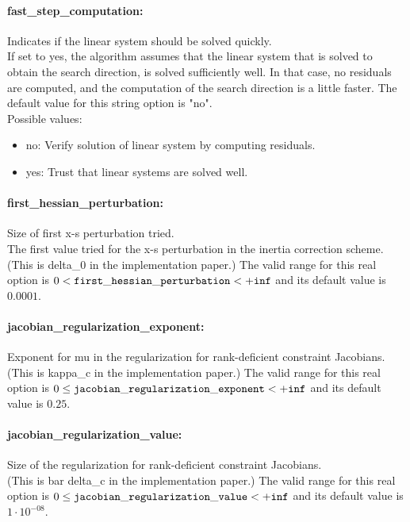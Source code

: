 \paragraph{fast\_step\_computation:}\label{sec:fast_step_computation} Indicates if the linear system should be solved quickly. $\;$ \\
 If set to yes, the algorithm assumes that the
linear system that is solved to obtain the search
direction, is solved sufficiently well. In that
case, no residuals are computed, and the
computation of the search direction is a little
faster.
The default value for this string option is "no".
\\ 
Possible values:
\begin{itemize}
   \item no: Verify solution of linear system by computing
residuals.
   \item yes: Trust that linear systems are solved well.
\end{itemize}

\paragraph{first\_hessian\_perturbation:}\label{sec:first_hessian_perturbation} Size of first x-s perturbation tried. $\;$ \\
 The first value tried for the x-s perturbation in
the inertia correction scheme.(This is delta\_0
in the implementation paper.) The valid range for this real option is 
$0 <  {\tt first\_hessian\_perturbation } <  {\tt +inf}$
and its default value is $0.0001$.


\paragraph{jacobian\_regularization\_exponent:}\label{sec:jacobian_regularization_exponent} Exponent for mu in the regularization for rank-deficient constraint Jacobians. $\;$ \\
 (This is kappa\_c in the implementation paper.) The valid range for this real option is 
$0 \le {\tt jacobian\_regularization\_exponent } <  {\tt +inf}$
and its default value is $0.25$.


\paragraph{jacobian\_regularization\_value:}\label{sec:jacobian_regularization_value} Size of the regularization for rank-deficient constraint Jacobians. $\;$ \\
 (This is bar delta\_c in the implementation
paper.) The valid range for this real option is 
$0 \le {\tt jacobian\_regularization\_value } <  {\tt +inf}$
and its default value is $1 \cdot 10^{-08}$.


